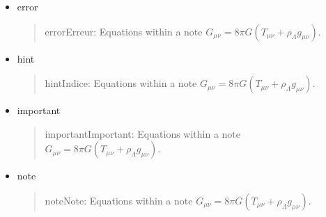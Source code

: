 \documentclass[a4paper,11pt,french]{rtdsphinxmanual}
\begin{document}
\begin{itemize}
\item {} 
error
\begin{quote}

\begin{notice}{error}{Erreur:}
Equations within a note
\(G_{\mu\nu} = 8 \pi G (T_{\mu\nu}  + \rho_\Lambda g_{\mu\nu})\).
\end{notice}
\end{quote}

\end{itemize}

\begin{itemize}
\item {} 
hint
\begin{quote}

\begin{notice}{hint}{Indice:}
Equations within a note
\(G_{\mu\nu} = 8 \pi G (T_{\mu\nu}  + \rho_\Lambda g_{\mu\nu})\).
\end{notice}
\end{quote}

\end{itemize}

\begin{itemize}
\item {} 
important
\begin{quote}

\begin{notice}{important}{Important:}
Equations within a note
\(G_{\mu\nu} = 8 \pi G (T_{\mu\nu}  + \rho_\Lambda g_{\mu\nu})\).
\end{notice}
\end{quote}

\end{itemize}

\begin{itemize}
\item {} 
note
\begin{quote}

\begin{notice}{note}{Note:}
Equations within a note
\(G_{\mu\nu} = 8 \pi G (T_{\mu\nu}  + \rho_\Lambda g_{\mu\nu})\).
\end{notice}
\end{quote}

\end{itemize}
\end{document}
